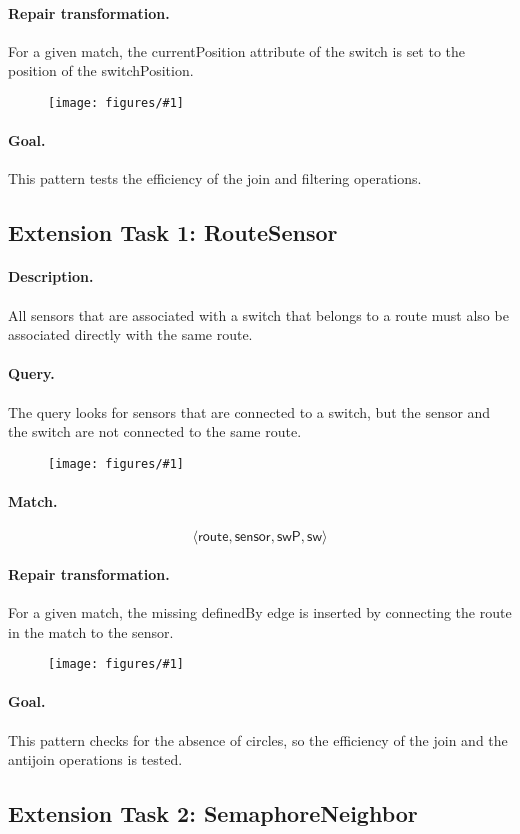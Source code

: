 \documentclass[submission,copyright,creativecommons]{eptcs}
\newcommand{\ttcpattern}[1]{
\begin{figure}[H] 
	\centering
	\texttt{[image: figures/\#1]}
\end{figure}}
\begin{document}
\paragraph{Repair transformation.} For a given match, the \textsf{currentPosition} attribute of the \textsf{switch} is set to the \textsf{position} of the \textsf{switchPosition}. 
\ttcpattern{transformation-switchset}
\paragraph{Goal.} This pattern tests the efficiency of the join and filtering operations.


\subsection{Extension Task 1: RouteSensor}
\label{routesensor}
\paragraph{Description.} All sensors that are associated with a switch that belongs to a route must also be associated directly with the same route.
\paragraph{Query.} The query looks for sensors that are connected to a switch, but the sensor and the switch are not connected to the same route.
\ttcpattern{pattern-routesensor}
\paragraph{Match.} $$\langle \mathsf{route}, \mathsf{sensor}, \mathsf{swP}, \mathsf{sw} \rangle$$
\paragraph{Repair transformation.} For a given match, the missing \textsf{definedBy} edge is inserted by connecting the \textsf{route} in the match to the \textsf{sensor}.
\ttcpattern{transformation-routesensor}
\paragraph{Goal.} This pattern checks for the absence of circles, so the efficiency of the join and the antijoin operations is tested.


\subsection{Extension Task 2: SemaphoreNeighbor}
\label{semaphoreneighbor}
\end{document}
